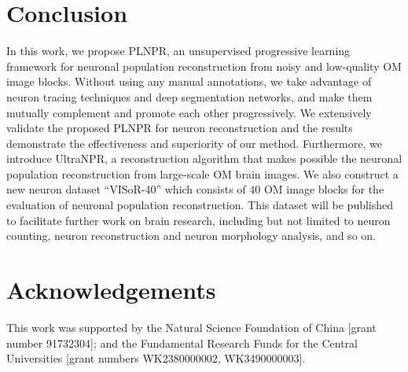 \documentclass[times,twocolumn,final]{elsarticle}
\newcommand{\md}[1]{\textcolor[rgb]{0,0,1}{#1}}
\begin{document}





\section{Conclusion}
\label{sec:conclusion}
In this work, we propose PLNPR, an \md{unsupervised} progressive learning framework for neuronal population reconstruction from noisy and low-quality OM image blocks.
Without using any manual annotations, we take advantage of neuron tracing techniques and deep segmentation networks, and make them mutually complement and promote each other progressively.
We extensively validate the proposed PLNPR for neuron reconstruction and the results demonstrate the effectiveness and superiority of our method.
Furthermore, we introduce UltraNPR, a reconstruction algorithm that makes possible the neuronal population reconstruction from large-scale OM brain images.
We also construct a new neuron dataset ``VISoR-40'' which consists of $ 40 $ OM image blocks for the evaluation of neuronal population reconstruction.
This dataset will be published to facilitate further work on brain research, including but not limited to neuron counting, neuron reconstruction and neuron morphology analysis, and so on.

\section*{Acknowledgements}
This work was supported by the Natural Science Foundation of China [grant number 91732304]; and the Fundamental Research Funds for the Central Universities [grant numbers WK2380000002, WK3490000003].
 


\end{document}
